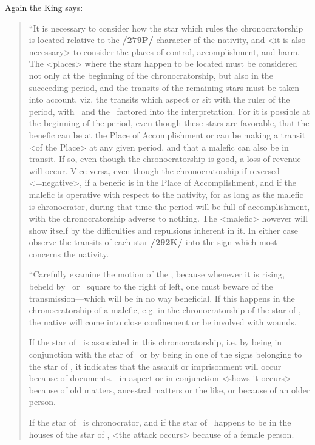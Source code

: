 Again the King says:
\begin{quote}
“It is necessary to consider how the star which rules the chronocratorship is located relative to the \textbf{/279P/} character of the nativity, and <it is also necessary> to consider the places of control, accomplishment, and harm. The <places> where the stars happen to be located must be considered not only at the beginning of the chronocratorship, but also in the succeeding period, and the transits of the remaining stars must be taken into account, viz. the transits which aspect or sit with the ruler of the period, with \Mercury\, and the \Moon\, factored into the interpretation. For it is possible at the beginning of the period, even though these stars are favorable, that the benefic can be at the Place of Accomplishment or can be making a transit <of the Place> at any given period, and that a malefic can also be in transit. If so, even though the chronocratorship is good, a loss of revenue will occur. Vice-versa, even though the chronocratorship if reversed <=negative>, if a benefic is in the Place of Accomplishment, and if the malefic is operative with respect to the nativity, for as long as the malefic is chronocrator, during that time the period will be full of accomplishment, with the chronocratorship adverse to nothing. The <malefic> however will show itself by the difficulties and repulsions inherent in it. In either case observe the transits of each star \textbf{/292K/} into the sign which most concerns the nativity.

“Carefully examine the motion of the \Moon, because whenever it is rising, beheld by \Mars\, or \Saturn\, square to the right of left, one must beware of the transmission—which will be in no way beneficial. If this happens in the chronocratorship of a malefic, e.g. in the chronocratorship of the star of \Mars, the native will come into close confinement or be involved with wounds. 

If the star of \Mercury\, is associated in this chronocratorship, i.e. by being in conjunction with the star of \Mars\, or by being in one of the signs belonging to the star of \Mars, it indicates that the assault or imprisonment will occur because of documents. \Saturn\, in aspect or in conjunction <shows it occurs> because of old matters, ancestral matters or the like, or because of an older person. 

If the star of \Venus\, is chronocrator, and if the star of \Mars\, happens to be in the houses of the star of \Venus, <the attack occurs> because of a female person. 


\end{quote}
